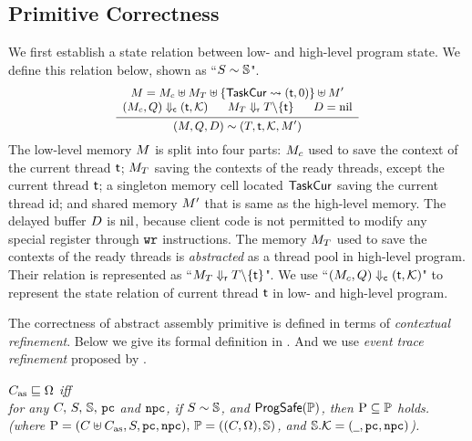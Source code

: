 \subsection{Primitive Correctness}
\label{subsec:correctness-primitive}

We first establish a state relation 
between low- and high-level program state. 
We define this relation below, shown as 
``${S} \sim {\mathbb{S}}$". 
\[
    \small
    \infer
    {
        \stateRel{(\Mem, \Rstate, \DBuf)}
            {(\thrdpool, \thrdid, \hthrdlocalst, \Mem')}
    }
    {
        \begin{array}{c}
            \Mem = \Mem_c \uplus \Mem_T \uplus 
                \{ \TaskCur \rightsquigarrow (\thrdid, 0) \}
                \uplus \Mem' \\
            \curStRel{(\Mem_c, \Rstate)}{(\thrdid, \hthrdlocalst)}
            \quad \ \ 
            \rdyStRel{\Mem_T}{\thrdpool \backslash \{ \thrdid \}}
            \quad \ \ 
            \DBuf = \nil
        \end{array}
    }
\]
The low-level memory $M$ is split into four parts: 
$M_c$ used to save the context of the current thread $\textsf{t}$; 
$M_T$ saving the contexts of the ready threads, 
except the current thread $\textsf{t}$; a singleton memory 
cell located $\mathsf{TaskCur}$ saving the current thread id; and shared 
memory $M'$ that is same as the high-level memory. 
The delayed buffer $D$ is $\text{nil}$, because client 
code is not permitted to modify any special register 
through $\texttt{wr}{}$ instructions. The memory $M_T$ used to 
save the contexts of the ready threads is {\it abstracted} as a thread pool 
in high-level program. Their relation is represented as 
``${M_T} \Downarrow_{\textsf{r}} {T \backslash \{ \textsf{t} \}}$".  
We use ``${(M_c, Q)} \Downarrow_{\textsf{c}} {(\textsf{t}, \mathcal{K})}$" 
to represent the state relation of current thread $\textsf{t}$ 
in low- and high-level program. 

The correctness of abstract assembly primitive 
is defined in terms of {\it contextual refinement}.  
Below we give its formal definition in 
\Def{\ref{def:prim-correctness}}.  
And we use {\it event trace refinement} 
proposed by \etal{Liang} \cite{liang14lics}.

\begin{definition}
    \em
    \label{def:prim-correctness}
    $C_{\text{as}} \sqsubseteq \Omega$ iff  \\
    for any $C, \, S, \, \mathbb{S}, \, \texttt{pc}$ and $\texttt{npc}$, if 
    ${S} \sim {\mathbb{S}}$, and $\textsf{ProgSafe}(\mathbb{P})$, 
    then $\text{P} \subseteq \mathbb{P}$ holds. 
    (where $\text{P} = (C \uplus C_{\text{as}}, S, \texttt{pc}, \texttt{npc}), \, 
        \mathbb{P} = ((C, \Omega), \mathbb{S})$, and 
        $\mathbb{S}.\mathcal{K} = (\underline{\ \,}, \texttt{pc}, \texttt{npc})$).  
\end{definition}

